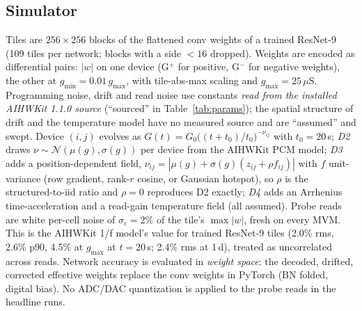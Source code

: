 \documentclass[journal]{IEEEtran}
\begin{document}
\subsection{Simulator}
Tiles are $256\times256$ blocks of the flattened conv weights of a trained ResNet-9 (109 tiles per network; blocks with a side $<16$ dropped).
Weights are encoded as differential pairs: $|w|$ on one device (G$^+$ for positive, G$^-$ for negative weights), the other at $g_{\min}=0.01\,g_{\max}$,
with tile-abs-max scaling and $g_{\max}=25\,\mu$S. Programming noise, drift and read noise use constants \emph{read from the installed AIHWKit 1.1.0 source}
\cite{rasch2021,rasch2023} (``sourced'' in Table~\ref{tab:params}); the spatial structure of drift and the temperature model have no
measured source and are ``assumed'' and swept.
Device $(i,j)$ evolves as $G(t)=G_0\big((t+t_0)/t_0\big)^{-\nu_{ij}}$ with $t_0=20$\,s;
\emph{D2} draws $\nu\sim\mathcal N(\mu(g),\sigma(g))$ per device from the AIHWKit PCM model; \emph{D3} adds a position-dependent field,
$\nu_{ij}=|\mu(g)+\sigma(g)(z_{ij}+\rho f_{ij})|$ with $f$ unit-variance (row gradient, rank-$r$ cosine, or Gaussian hotspot), so $\rho$ is the
structured-to-iid ratio and $\rho=0$ reproduces D2 exactly; \emph{D4} adds an Arrhenius time-acceleration and a read-gain temperature field (all assumed).
Probe reads are white per-cell noise of $\sigma_c=2\%$ of the tile's $\max|w|$, fresh on every MVM. This is the AIHWKit 1/f model's value
for trained ResNet-9 tiles (2.0\% rms, 2.6\% p90, 4.5\% at $g_{\max}$ at $t=20$\,s; 2.4\% rms at 1\,d), treated as uncorrelated across reads.
Network accuracy is evaluated in \emph{weight space}: the decoded, drifted, corrected effective weights replace the conv weights in PyTorch (BN folded, digital bias).
No ADC/DAC quantization is applied to the probe reads in the headline runs.
\end{document}
